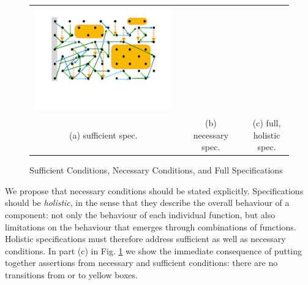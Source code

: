 \begin{figure}[htb]
\begin{tabular}{clclc}
\begin{minipage}{0.29\textwidth}
 \includegraphics[width=\linewidth, trim=100  120 130 60,clip]{diagrams/neccSuffYellowAllExtended.pdf}
 \end{minipage}
\\
(a) sufficient  spec.& & (b) necessary spec. & & (c) full, holistic spec.
 \end{tabular}
  \vspace*{-2.5mm}
  \caption{Sufficient Conditions, Necessary Conditions, and Full Specifications}
 \label{fig:NecessaryAndSuff}
 \end{figure}
 
 We propose that  necessary conditions should be stated
 explicitly. Specifications should be \emph{holistic}, in the sense
 that they describe the  overall behaviour of a component: not only the
 behaviour of each individual function, but also limitations on the
 behaviour that emerges through combinations of functions.
%
Holistic specifications must therefore address sufficient as well as necessary conditions.
In   part (c)    in Fig. \ref{fig:NecessaryAndSuff} we show the 
immediate consequence of putting together assertions from necessary and sufficient conditions: 
there are no transitions from or to yellow boxes.


